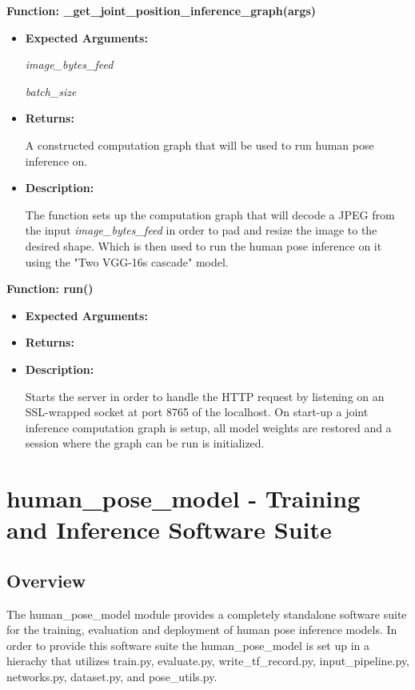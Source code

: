 \documentclass{scrreprt}
\begin{document}
\textbf{Function: \_get\_joint\_position\_inference\_graph(args)}
\begin{itemize}
    \item \textbf{Expected Arguments:}

            \quad\textit{image\_bytes\_feed}

            \quad\textit{batch\_size}

    \item \textbf{Returns:}

            A constructed computation graph that will be used to run human pose inference on.

    \item \textbf{Description:}

            The function sets up the computation graph that will decode a JPEG from the input \textit{image\_bytes\_feed} in order to pad and resize the image to the desired shape. Which is then used to run the human pose inference on it using the "Two VGG-16s cascade" model.
\end{itemize}

\textbf{Function: run()}
\begin{itemize}
    \item \textbf{Expected Arguments:}

    \item \textbf{Returns:}

    \item \textbf{Description:}

            Starts the server in order to handle the HTTP request by listening on an SSL-wrapped socket at port 8765 of the localhost. On start-up a joint inference computation graph is setup, all model weights are restored and a session where the graph can be run is initialized.

\end{itemize}

\section{human\_pose\_model - Training and Inference Software Suite}

\subsection{Overview}
The human\_pose\_model module provides a completely standalone software suite for the training, evaluation and deployment of human pose inference models. In order to provide this software suite the human\_pose\_model is set up in a hierachy that utilizes train.py, evaluate.py, write_tf_record.py, input_pipeline.py, networks.py, dataset.py, and pose_utils.py.
\end{document}
